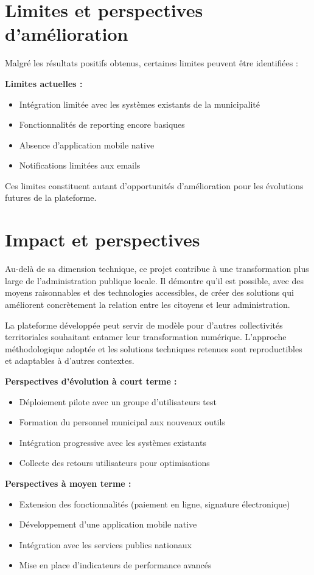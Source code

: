 \section*{Limites et perspectives d'amélioration}

Malgré les résultats positifs obtenus, certaines limites peuvent être identifiées :

\textbf{Limites actuelles :}
\begin{itemize}
\item Intégration limitée avec les systèmes existants de la municipalité
\item Fonctionnalités de reporting encore basiques
\item Absence d'application mobile native
\item Notifications limitées aux emails
\end{itemize}

Ces limites constituent autant d'opportunités d'amélioration pour les évolutions futures de la plateforme.

\section*{Impact et perspectives}

Au-delà de sa dimension technique, ce projet contribue à une transformation plus large de l'administration publique locale. Il démontre qu'il est possible, avec des moyens raisonnables et des technologies accessibles, de créer des solutions qui améliorent concrètement la relation entre les citoyens et leur administration.

La plateforme développée peut servir de modèle pour d'autres collectivités territoriales souhaitant entamer leur transformation numérique. L'approche méthodologique adoptée et les solutions techniques retenues sont reproductibles et adaptables à d'autres contextes.

\textbf{Perspectives d'évolution à court terme :}
\begin{itemize}
\item Déploiement pilote avec un groupe d'utilisateurs test
\item Formation du personnel municipal aux nouveaux outils
\item Intégration progressive avec les systèmes existants
\item Collecte des retours utilisateurs pour optimisations
\end{itemize}

\textbf{Perspectives à moyen terme :}
\begin{itemize}
\item Extension des fonctionnalités (paiement en ligne, signature électronique)
\item Développement d'une application mobile native
\item Intégration avec les services publics nationaux
\item Mise en place d'indicateurs de performance avancés
\end{itemize}

